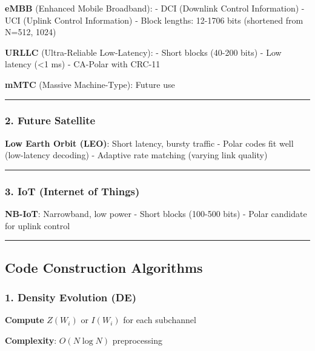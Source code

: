\textbf{eMBB} (Enhanced Mobile Broadband): - DCI (Downlink Control
Information) - UCI (Uplink Control Information) - Block lengths: 12-1706
bits (shortened from N=512, 1024)

\textbf{URLLC} (Ultra-Reliable Low-Latency): - Short blocks (40-200
bits) - Low latency (\textless1 ms) - CA-Polar with CRC-11

\textbf{mMTC} (Massive Machine-Type): Future use

\begin{center}\rule{0.5\linewidth}{0.5pt}\end{center}

\subsubsection{2. Future Satellite}\label{future-satellite}

\textbf{Low Earth Orbit (LEO)}: Short latency, bursty traffic - Polar
codes fit well (low-latency decoding) - Adaptive rate matching (varying
link quality)

\begin{center}\rule{0.5\linewidth}{0.5pt}\end{center}

\subsubsection{3. IoT (Internet of
Things)}\label{iot-internet-of-things}

\textbf{NB-IoT}: Narrowband, low power - Short blocks (100-500 bits) -
Polar candidate for uplink control

\begin{center}\rule{0.5\linewidth}{0.5pt}\end{center}

\subsection{Code Construction
Algorithms}\label{code-construction-algorithms}

\subsubsection{1. Density Evolution (DE)}\label{density-evolution-de}

\textbf{Compute} \(Z(W_i)\) or \(I(W_i)\) for each subchannel

\textbf{Complexity}: \(O(N \log N)\) preprocessing

